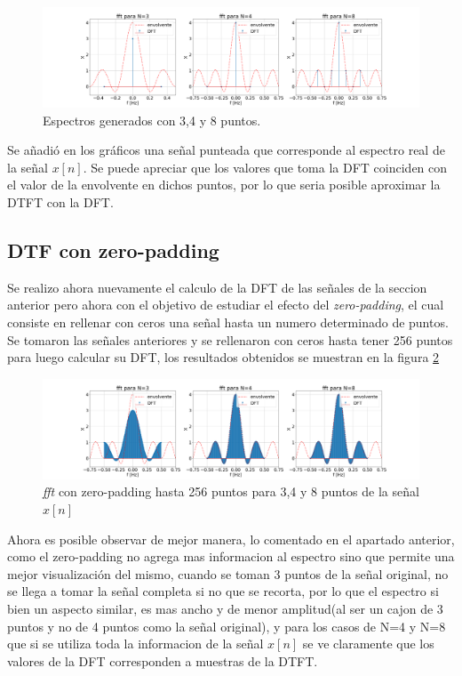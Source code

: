 \documentclass[11pt,a4paper]{article}
\begin{document}
    \begin{figure}[htb]
    \centering
    \includegraphics[width=\textwidth]{Img/punto_3_b.png}
    \caption{Espectros generados con 3,4 y 8 puntos.}
    \label{fig.3b}
    \end{figure}

    Se añadió en los gráficos una señal punteada que corresponde al espectro real de la señal $x[n]$.
    Se puede apreciar que los valores que toma la DFT coinciden con el valor de la envolvente en dichos puntos, por lo que seria posible aproximar la DTFT con la DFT.

    \subsection{DTF con zero-padding}
    Se realizo ahora nuevamente el calculo de la DFT de las señales de la seccion anterior pero ahora con el objetivo de estudiar el efecto del \textit{zero-padding}, el cual consiste en rellenar con ceros una señal hasta un numero determinado de puntos. Se tomaron las señales anteriores y se rellenaron con ceros hasta tener 256 puntos para luego calcular su DFT, los resultados obtenidos se muestran en la figura \ref{fig.1c}
    \begin{figure}[htb]
    \centering
    \includegraphics[width=\textwidth]{Img/punto_3_c.png}
    \caption{\textit{fft} con zero-padding hasta 256 puntos para 3,4 y 8 puntos de la señal $x[n]$}
    \label{fig.1c}
    \end{figure}
    Ahora es posible observar de mejor manera, lo comentado en el apartado anterior, como el zero-padding no agrega mas informacion al espectro sino que permite una mejor visualización del mismo, cuando se toman 3 puntos de la señal original, no se llega a tomar la señal completa si no que se recorta, por lo que el espectro si bien un aspecto similar, es mas ancho y de menor amplitud(al ser un cajon de 3 puntos y no de 4 puntos como la señal original), y para los casos de N=4 y N=8 que si se utiliza toda la informacion de la señal $x[n]$ se ve claramente que los valores de la DFT corresponden a muestras de la DTFT.
\end{document}
